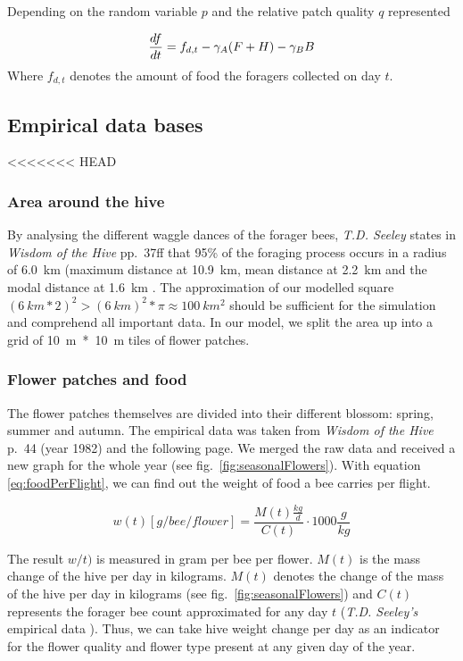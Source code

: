		\label{chap:foragersDistribution}
		Depending on the random variable $p$ and the relative patch quality $q$ represented 
		
		
		\begin{equation}\label{eq:changeFoodStoreDyn}
			{df \over dt} = f_{d,t}- \gamma_A (F+H) - \gamma_B B
		\end{equation}
		Where $f_{d,t}$ denotes the amount of food the foragers collected on day $t$.
		
	\subsection{Empirical data bases}
<<<<<<< HEAD
		\subsubsection{Area around the hive}
			By analysing the different waggle dances of the forager bees, \textit{T.D. Seeley} states in \textit{Wisdom of the Hive} pp.~37ff that 95\% of the foraging process occurs in a radius of 6.0~km (maximum distance at 10.9~km, mean distance at 2.2~km and the modal distance at 1.6~km \cite{seeley95}. The approximation of our modelled square $(6~km * 2)^2 > (6~km)^2*\pi \approx 100~km^2$ should be sufficient for the simulation and comprehend all important data. In our model, we split the area up into a grid of 10~m~*~10~m tiles of flower patches.
		\subsubsection{Flower patches and food}
			The flower patches themselves are divided into their different blossom: spring, summer and autumn. The empirical data was taken from \textit{Wisdom of the Hive} p.~44 (year 1982) and the following page. We merged the raw data and received a new graph for the whole year (see fig.~\ref{fig:seasonalFlowers}). With equation \ref{eq:foodPerFlight}, we can find out the weight of food a bee carries per flight. 
			
			\begin{equation}\label{eq:foodPerFlight}
						w(t) [g/bee/flower] = \frac{M(t) \frac{kg}{d}}{C(t)}\cdot 1000 \frac{g}{kg}
			\end{equation}
			
			The result $w/t)$ is measured in gram per bee per flower. $M(t)$ is the mass change of the hive per day in kilograms.
			$M(t)$ denotes the change of the mass of the hive per day in kilograms (see fig.~\ref{fig:seasonalFlowers}) and $C(t)$ represents the forager bee count approximated for any day $t$ (\textit{T.D. Seeley's} empirical data \cite{seeley95}). Thus, we can take hive weight change per day as an indicator for the flower quality and flower type present at any given day of the year. 
			
